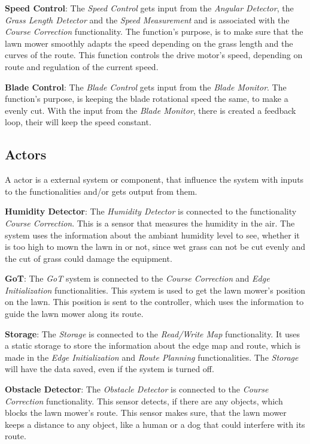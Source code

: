 \textbf{Speed Control}:
The \textit{Speed Control} gets input from the \textit{Angular Detector}, the \textit{Grass Length Detector} and the \textit{Speed Measurement} and is associated with the \textit{Course Correction} functionality. The function's purpose, is to make sure that the lawn mower smoothly adapts the speed depending on the grass length and the curves of the route. This function controls the drive motor's speed, depending on route and regulation of the current speed.

\textbf{Blade Control}:
The \textit{Blade Control} gets input from the \textit{Blade Monitor}. The function's purpose, is keeping the blade rotational speed the same, to make a evenly cut. With the input from the \textit{Blade Monitor}, there is created a feedback loop, their will keep the speed constant.

\subsection{Actors}

A actor is a external system or component, that influence the system with inputs to the functionalities and/or gets output from them.

\textbf{Humidity Detector}:
The \textit{Humidity Detector} is connected to the functionality \textit{Course Correction}. This is a sensor that measures the humidity in the air. The system uses the information about the ambiant humidity level to see, whether it is too high to mown the lawn in or not, since wet grass can not be cut evenly and the cut of grass could damage the equipment. 

\textbf{GoT}:
The \textit{GoT} system is connected to the \textit{Course Correction} and \textit{Edge Initialization} functionalities. This system is used to get the lawn mower's position on the lawn. This position is sent to the controller, which uses the information to guide the lawn mower along its route.

\textbf{Storage}:
The \textit{Storage} is connected to the \textit{Read/Write Map} functionality. It uses a static storage to store the information about the edge map and route, which is made in the \textit{Edge Initialization} and \textit{Route Planning} functionalities. The \textit{Storage} will have the data saved, even if the system is turned off.

\textbf{Obstacle Detector}:
The \textit{Obstacle Detector} is connected to the \textit{Course Correction} functionality. This sensor detects, if there are any objects, which blocks the lawn mower's route. This sensor makes sure, that the lawn mower keeps a distance to any object, like a human or a dog that could interfere with its route.

